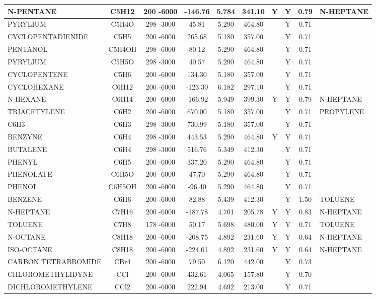\begin{longtable}{@{\extracolsep{\fill}}|l|c|c|c|c|c|c|c|c|l|}
N-PENTANE&C5H12&200 -6000& -146.76& 5.784&   341.10&Y&Y& 0.79&N-HEPTANE\\ \hline
PYRYLIUM&C5H4O&298 -3000&   45.81& 5.290&   464.80& &Y& 0.71&\\ \hline
CYCLOPENTADIENIDE&C5H5&200 -6000&  265.68& 5.180&   357.00& &Y& 0.71&\\ \hline
PENTANOL&C5H4OH&298 -6000&   80.12& 5.290&   464.80& &Y& 0.71&\\ \hline
PYRYLIUM&C5H5O&298 -3000&   40.57& 5.290&   464.80& &Y& 0.71&\\ \hline
CYCLOPENTENE&C5H6&200 -6000&  134.30& 5.180&   357.00& &Y& 0.71&\\ \hline
CYCLOHEXANE&C6H12&200 -6000& -123.30& 6.182&   297.10& &Y& 0.71&\\ \hline
N-HEXANE&C6H14&200 -6000& -166.92& 5.949&   399.30&Y&Y& 0.79&N-HEPTANE\\ \hline
TRIACETYLENE&C6H2&200 -6000&  670.00& 5.180&   357.00& &Y& 0.71&PROPYLENE\\ \hline
C6H3&C6H3&298 -3000&  730.99& 5.180&   357.00& &Y& 0.71&\\ \hline
BENZYNE&C6H4&298 -3000&  443.53& 5.290&   464.80&Y&Y& 0.71&\\ \hline
BUTALENE&C6H4&298 -3000&  516.76& 5.349&   412.30& &Y& 0.71&\\ \hline
PHENYL&C6H5&200 -6000&  337.20& 5.290&   464.80& &Y& 0.71&\\ \hline
PHENOLATE&C6H5O&200 -6000&   47.70& 5.290&   464.80& &Y& 0.71&\\ \hline
PHENOL&C6H5OH&200 -6000&  -96.40& 5.290&   464.80& &Y& 0.71&\\ \hline
BENZENE&C6H6&200 -6000&   82.88& 5.439&   412.30& &Y& 1.50&TOLUENE\\ \hline
N-HEPTANE&C7H16&200 -6000& -187.78& 4.701&   205.78&Y&Y& 0.83&N-HEPTANE\\ \hline
TOLUENE&C7H8&178 -6000&   50.17& 5.698&   480.00&Y&Y& 0.71&TOLUENE\\ \hline
N-OCTANE&C8H18&200 -6000& -208.75& 4.892&   231.60&Y&Y& 0.64&N-HEPTANE\\ \hline
ISO-OCTANE&C8H18&200 -6000& -224.01& 4.892&   231.60&Y&Y& 0.64&N-HEPTANE\\ \hline
CARBON TETRABROMIDE&CBr4&200 -6000&   79.50& 6.120&   442.00& &Y& 0.73&\\ \hline
CHLOROMETHYLIDYNE&CCl&200 -6000&  432.61& 4.065&   157.80& &Y& 0.70&\\ \hline
DICHLOROMETHYLENE&CCl2&200 -6000&  222.94& 4.692&   213.00& &Y& 0.71&\\ \hline

\end{longtable}
